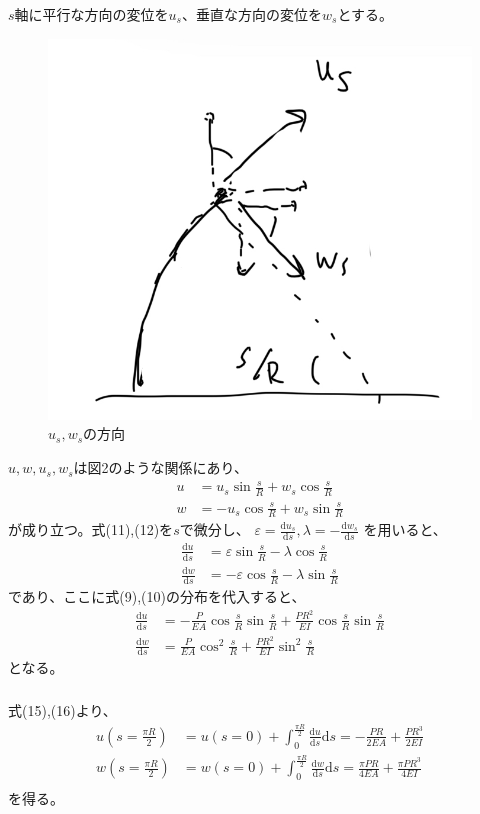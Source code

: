 \documentclass[a4paper]{jsarticle}
\begin{document}
\subsubsection{}
$s$軸に平行な方向の変位を$u_s$、垂直な方向の変位を$w_s$とする。
\begin{figure}
  \centering
  \includegraphics[width=0.3\hsize]{fig2.png}
  \caption{$u_s, w_s$の方向}
\end{figure}
$u, w, u_s, w_s$は図2のような関係にあり、
\begin{align}
  u &= u_s \sin \frac{s}{R} + w_s \cos \frac{s}{R} \\
  w &= -u_s \cos \frac{s}{R} + w_s \sin \frac{s}{R}
\end{align}
が成り立つ。式(11),(12)を$s$で微分し、
$\varepsilon = \frac{\mathrm{d} u_s}{\mathrm{d} s}, \lambda = -\frac{\mathrm{d} w_s}{\mathrm{d} s}$
を用いると、
\begin{align}
  \frac{\mathrm{d} u}{\mathrm{d} s}
  &= \varepsilon \sin \frac{s}{R} 
  - \lambda \cos \frac{s}{R} \\
  \frac{\mathrm{d} w}{\mathrm{d} s}
  &= -\varepsilon \cos \frac{s}{R} 
  - \lambda \sin \frac{s}{R}
\end{align}
であり、ここに式(9),(10)の分布を代入すると、
\begin{align}
  \frac{\mathrm{d} u}{\mathrm{d} s}
  &= -\frac{P}{E A} \cos \frac{s}{R} \sin \frac{s}{R}
  + \frac{P R^2}{E I} \cos \frac{s}{R} \sin \frac{s}{R} \\
  \frac{\mathrm{d} w}{\mathrm{d} s}
  &= \frac{P}{E A} \cos^2 \frac{s}{R} + \frac{P R^2}{E I} \sin^2 \frac{s}{R}
\end{align}
となる。

\subsubsection{}
式(15),(16)より、
\begin{align}
  u \left(s = \frac{\pi R}{2}\right) &= u(s = 0)
  + \int_0^{\frac{\pi R}{2}} \frac{\mathrm{d} u}{\mathrm{d} s} \mathrm{d} s
  = -\frac{P R}{2 E A} + \frac{P R^3}{2 E I}\\
  w \left(s = \frac{\pi R}{2}\right) &= w(s = 0)
  + \int_0^{\frac{\pi R}{2}} \frac{\mathrm{d} w}{\mathrm{d} s} \mathrm{d} s
  = \frac{\pi P R}{4 E A} + \frac{\pi P R^3}{4 E I}\\
\end{align}
を得る。
\end{document}

